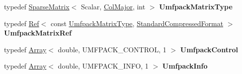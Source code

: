 \begin{DoxyCompactItemize}
typedef \hyperlink{group___sparse_core___module_class_eigen_1_1_sparse_matrix}{Sparse\+Matrix}$<$ Scalar, \hyperlink{group__enums_ggaacded1a18ae58b0f554751f6cdf9eb13a0cbd4bdd0abcfc0224c5fcb5e4f6669a}{Col\+Major}, int $>$ {\bfseries Umfpack\+Matrix\+Type}
\item 
\mbox{\label{class_eigen_1_1_umf_pack_l_u_adf053e553c6f76bb02f4402b5f94140a}} 
typedef \hyperlink{group___core___module_class_eigen_1_1_ref}{Ref}$<$ const \hyperlink{group___sparse_core___module}{Umfpack\+Matrix\+Type}, \hyperlink{namespace_eigen_a668ffb0fb66c55c1c98bd35c52df648eaf81fc519ed9cc0ebc6aac69a366086a5}{Standard\+Compressed\+Format} $>$ {\bfseries Umfpack\+Matrix\+Ref}
\item 
\mbox{\label{class_eigen_1_1_umf_pack_l_u_a69a586a34ae369164d464c5551bcce73}} 
typedef \hyperlink{group___core___module_class_eigen_1_1_array}{Array}$<$ double, U\+M\+F\+P\+A\+C\+K\+\_\+\+C\+O\+N\+T\+R\+OL, 1 $>$ {\bfseries Umfpack\+Control}
\item 
\mbox{\label{class_eigen_1_1_umf_pack_l_u_a4d5a177b46684f13e132768f27723382}} 
typedef \hyperlink{group___core___module_class_eigen_1_1_array}{Array}$<$ double, U\+M\+F\+P\+A\+C\+K\+\_\+\+I\+N\+FO, 1 $>$ {\bfseries Umfpack\+Info}
\end{DoxyCompactItemize}
